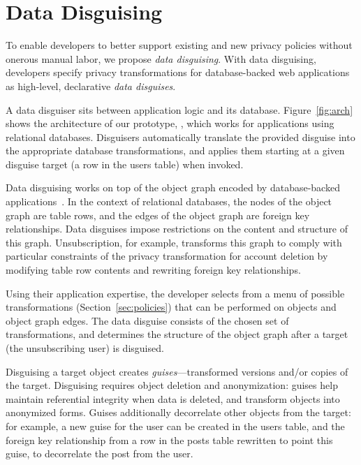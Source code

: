 \section{Data Disguising}
%

%
To enable developers to better support existing and new privacy policies without onerous manual
labor, we propose \emph{data disguising}.
%
With data disguising, developers specify privacy transformations for database-backed web
applications as high-level, declarative \emph{data disguises}.

A data disguiser sits between application logic and its database. Figure~\ref{fig:arch} shows the
architecture of our prototype, \sys, which works for applications using relational databases.
Disguisers automatically translate the provided disguise into the appropriate database transformations, and
applies them starting at a given disguise target (\eg a row in the users table) when invoked.

Data disguising works on top of the object graph encoded by database-backed
applications~\cite{orm}. In the context of relational databases, the nodes of the object graph are
table rows, and the edges of the object graph are foreign key relationships. Data disguises impose
restrictions on the content and structure of this graph. Unsubscription, for example, transforms
this graph to comply with particular constraints of the privacy transformation for account deletion
by modifying table row contents and rewriting foreign key relationships.

Using their application expertise, the developer selects from a menu of possible transformations
(Section~\ref{sec:policies}) that can be performed on objects and object graph edges.
The data disguise consists of the chosen set of transformations, and determines the
structure of the object graph after a target (\eg the unsubscribing user) is disguised.

Disguising a target object creates \emph{guises}---transformed versions and/or copies of the target.
Disguising requires object deletion and anonymization: guises help maintain referential integrity
when data is deleted, and transform objects into anonymized forms.  Guises additionally decorrelate
other objects from the target: for example, a new guise for the user can be created in the users
table, and the foreign key relationship from a row in the posts table rewritten to point this guise,
to decorrelate the post from the user.

